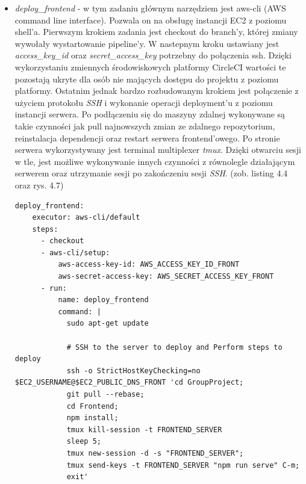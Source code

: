 \begin{itemize}
\newpage
	\item \textit{deploy\_frontend} - w tym zadaniu głównym narzędziem jest aws-cli (AWS command line interface). Pozwala on na obsługę instancji EC2 z poziomu shell'a. Pierwszym krokiem zadania jest checkout do branch'y, której zmiany wywołały wystartowanie pipeline'y. W nastepnym kroku ustawiany jest \textit{access\_key\_id} oraz \textit{secret\_access\_key} potrzebny do połączenia ssh. Dzięki wykorzystaniu zmiennych środowiskowych platformy CircleCI wartości te pozostają ukryte dla osób nie mających dostępu do projektu z poziomu platformy. Ostatnim jednak bardzo rozbudowanym krokiem jest połączenie z użyciem protokołu \textit{SSH} i wykonanie operacji deployment'u z poziomu instancji serwera. Po podłączeniu się do maszyny zdalnej wykonywane są takie czynności jak pull najnowszych zmian ze zdalnego repozytorium, reinstalacja dependencji oraz restart serwera frontend'owego. Po stronie serwera wykorzystywany jest terminal multiplexer \textit{tmux}. Dzięki otwarciu sesji w tle, jest możliwe wykonywanie innych czynności z równolegle działającym serwerem oraz utrzymanie sesji po zakończeniu sesji \textit{SSH}. (zob. listing 4.4 oraz rys. 4.7)
\begin{lstlisting}[caption=Część skryptu config.yml odpowiadająca za wykonanie zadania \textit{deploy\_frontend}.]
deploy_frontend:
    executor: aws-cli/default
    steps:
      - checkout
      - aws-cli/setup:
          aws-access-key-id: AWS_ACCESS_KEY_ID_FRONT
          aws-secret-access-key: AWS_SECRET_ACCESS_KEY_FRONT
      - run:
          name: deploy_frontend
          command: |
            sudo apt-get update

            # SSH to the server to deploy and Perform steps to deploy
            ssh -o StrictHostKeyChecking=no $EC2_USERNAME@$EC2_PUBLIC_DNS_FRONT 'cd GroupProject; 
            git pull --rebase;
            cd Frontend;
            npm install;
            tmux kill-session -t FRONTEND_SERVER
            sleep 5;
            tmux new-session -d -s "FRONTEND_SERVER";
            tmux send-keys -t FRONTEND_SERVER "npm run serve" C-m;
            exit'


\end{lstlisting}
\end{itemize}
